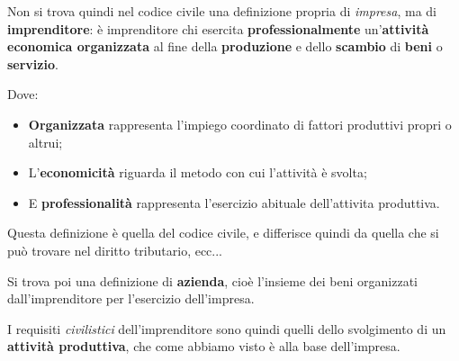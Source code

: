\documentclass[a4paper,11pt]{article}
\begin{document}
Non si trova quindi nel codice civile una definizione propria di \textit{impresa}, ma di \textbf{imprenditore}: è imprenditore chi esercita \textbf{professionalmente} un'\textbf{attività economica organizzata} al fine della \textbf{produzione} e dello \textbf{scambio} di \textbf{beni} o \textbf{servizio}.

Dove:
\begin{itemize}
	\item \textbf{Organizzata} rappresenta l'impiego coordinato di fattori produttivi propri o altrui;
	\item L'\textbf{economicità} riguarda il metodo con cui l'attività è svolta;
	\item E \textbf{professionalità} rappresenta l'esercizio abituale dell'attivita produttiva.
\end{itemize}

Questa definizione è quella del codice civile, e differisce quindi da quella che si può trovare nel diritto tributario, ecc... 

Si trova poi una definizione di \textbf{azienda}, cioè l'insieme dei beni organizzati dall'imprenditore per l'esercizio dell'impresa.

I requisiti \textit{civilistici} dell'imprenditore sono quindi quelli dello svolgimento di un \textbf{attività produttiva}, che come abbiamo visto è alla base dell'impresa.
\end{document}

